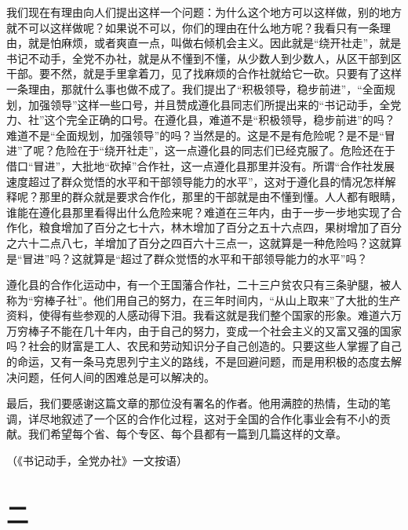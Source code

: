 我们现在有理由向人们提出这样一个问题：为什么这个地方可以这样做，别的地方就不可以这样做呢？如果说不可以，你们的理由在什么地方呢？我看只有一条理由，就是怕麻烦，或者爽直一点，叫做右倾机会主义。因此就是“绕开社走”，就是书记不动手，全党不办社，就是从不懂到不懂，从少数人到少数人，从区干部到区干部。要不然，就是手里拿着刀，见了找麻烦的合作社就给它一砍。只要有了这样一条理由，那就什么事也做不成了。我们提出了“积极领导，稳步前进”，“全面规划，加强领导”这样一些口号，并且赞成遵化县同志们所提出来的“书记动手，全党力、社”这个完全正确的口号。在遵化县，难道不是“积极领导，稳步前进”的吗？难道不是“全面规划，加强领导”的吗？当然是的。这是不是有危险呢？是不是“冒进”了呢？危险在于“绕开社走”，这一点遵化县的同志们已经克服了。危险还在于借口“冒进”，大批地“砍掉”合作社，这一点遵化县那里并没有。所谓“合作社发展速度超过了群众觉悟的水平和干部领导能力的水平”，这对于遵化县的情况怎样解释呢？那里的群众就是要求合作化，那里的干部就是由不懂到懂。人人都有眼睛，谁能在遵化县那里看得出什么危险来呢？难道在三年内，由于一步一步地实现了合作化，粮食增加了百分之七十六，林木增加了百分之五十六点四，果树增加了百分之六十二点八七，羊增加了百分之四百六十三点一，这就算是一种危险吗？这就算是“冒进”吗？这就算是“超过了群众觉悟的水平和干部领导能力的水平”吗？

遵化县的合作化运动中，有一个王国藩合作社，二十三户贫农只有三条驴腿，被人称为“穷棒子社”。他们用自己的努力，在三年时间内，“从山上取来”了大批的生产资料，使得有些参观的人感动得下泪。我看这就是我们整个国家的形象。难道六万万穷棒子不能在几十年内，由于自己的努力，变成一个社会主义的又富又强的国家吗？社会的财富是工人、农民和劳动知识分子自己创造的。只要这些人掌握了自己的命运，又有一条马克思列宁主义的路线，不是回避问题，而是用积极的态度去解决问题，任何人间的困难总是可以解决的。

最后，我们要感谢这篇文章的那位没有署名的作者。他用满腔的热情，生动的笔调，详尽地叙述了一个区的合作化过程，这对于全国的合作化事业会有不小的贡献。我们希望每个省、每个专区、每个县都有一篇到几篇这样的文章。


（《书记动手，全党办社》一文按语）

\section*{二}

